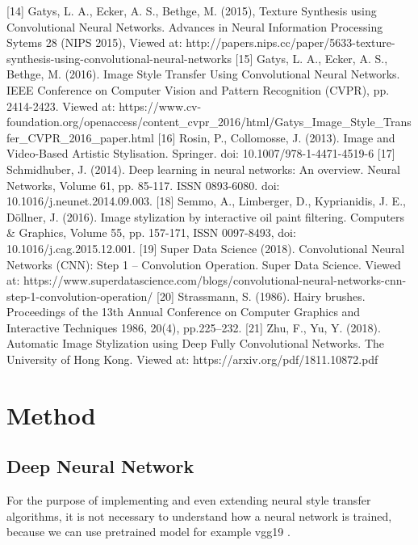 \documentclass[runningheads]{llncs}
\begin{document}
[14] Gatys, L. A., Ecker, A. S., Bethge, M. (2015), Texture Synthesis using Convolutional Neural Networks. Advances in Neural Information Processing Sytems 28 (NIPS 2015), Viewed at: http://papers.nips.cc/paper/5633-texture-synthesis-using-convolutional-neural-networks
[15] Gatys, L. A., Ecker, A. S., Bethge, M. (2016). Image Style Transfer Using Convolutional Neural Networks. IEEE Conference on Computer Vision and Pattern Recognition (CVPR), pp. 2414-2423. Viewed at: https://www.cv-foundation.org/openaccess/content_cvpr_2016/html/Gatys_Image_Style_Transfer_CVPR_2016_paper.html
[16] Rosin, P., Collomosse, J. (2013). Image and Video-Based Artistic Stylisation. Springer. doi: 10.1007/978-1-4471-4519-6 
[17] Schmidhuber, J. (2014). Deep learning in neural networks: An overview. Neural Networks, Volume 61, pp. 85-117. ISSN 0893-6080. doi: 10.1016/j.neunet.2014.09.003.
[18] Semmo, A., Limberger, D., Kyprianidis, J. E., Döllner, J. (2016). Image stylization by interactive oil paint filtering. Computers & Graphics, Volume 55, pp. 157-171, ISSN 0097-8493, doi: 10.1016/j.cag.2015.12.001.
[19] Super Data Science (2018). Convolutional Neural Networks (CNN): Step 1 – Convolution Operation. Super Data Science. Viewed at: https://www.superdatascience.com/blogs/convolutional-neural-networks-cnn-step-1-convolution-operation/ 
[20] Strassmann, S. (1986). Hairy brushes. Proceedings of the 13th Annual Conference on Computer Graphics and Interactive Techniques 1986, 20(4), pp.225–232.
[21] Zhu, F., Yu, Y. (2018). Automatic Image Stylization using Deep Fully Convolutional Networks. The University of Hong Kong. Viewed at: https://arxiv.org/pdf/1811.10872.pdf




\section{Method}

\subsection{Deep Neural Network}

For the purpose of implementing and even extending neural style transfer algorithms,
it is not necessary to understand how a neural network is trained, because
we can use pretrained model for example vgg19 \cite{vgg19}.
\end{document}
